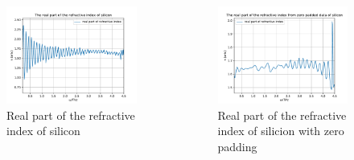 \documentclass[aspectratio=1610, 9pt]{beamer}
\begin{document}
\begin{frame}
  \begin{center}
    \begin{columns}
      \begin{column}{0.5\textwidth}
        \begin{figure}
        \includegraphics[width=\textwidth]{silicon/THz_real_index.pdf}
        \caption{Real part of the refractive index of silicon}
        \end{figure}
      \end{column}
      \begin{column}{0.5\textwidth}
        \begin{figure}
        \includegraphics[width=\textwidth]{silicon/THz_real_index_zero.pdf}
        \caption{Real part of the refractive index of silicion with zero padding}
        \end{figure}
      \end{column}
    \end{columns}
  \end{center}
\end{frame}
\end{document}
